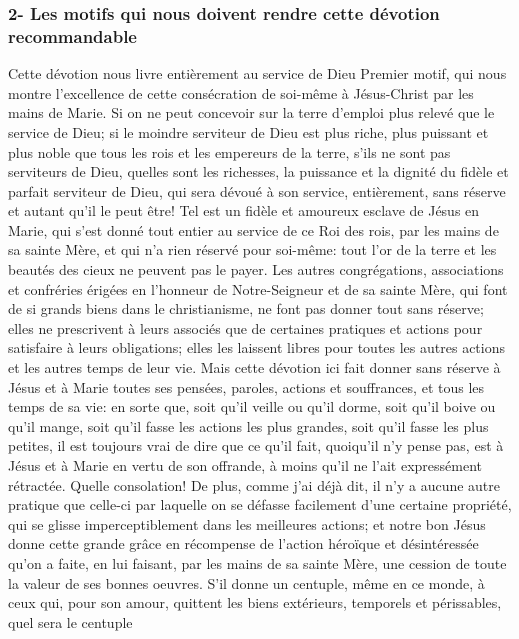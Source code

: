 \subsubsection{2- Les motifs qui nous doivent rendre cette dévotion recommandable}
Cette dévotion nous livre entièrement au service de Dieu
 Premier motif, qui nous montre l'excellence de cette consécration de soi-même à Jésus-Christ par les mains
de Marie.
Si on ne peut concevoir sur la terre d'emploi plus relevé que le service de Dieu; si le moindre serviteur de Dieu est
plus riche, plus puissant et plus noble que tous les rois et les empereurs de la terre, s'ils ne sont pas serviteurs de
Dieu, quelles sont les richesses, la puissance et la dignité du fidèle et parfait serviteur de Dieu, qui sera dévoué à
son service, entièrement, sans réserve et autant qu'il le peut être! Tel est un fidèle et amoureux esclave de Jésus
en Marie, qui s'est donné tout entier au service de ce Roi des rois, par les mains de sa sainte Mère, et qui n'a rien
réservé pour soi-même: tout l'or de la terre et les beautés des cieux ne peuvent pas le payer.
 Les autres congrégations, associations et confréries érigées en l'honneur de Notre-Seigneur et de sa sainte
Mère, qui font de si grands biens dans le christianisme, ne font pas donner tout sans réserve; elles ne prescrivent
à leurs associés que de certaines pratiques et actions pour satisfaire à leurs obligations; elles les laissent libres
pour toutes les autres actions et les autres temps de leur vie. Mais cette dévotion ici fait donner sans réserve à
Jésus et à Marie toutes ses pensées, paroles, actions et souffrances, et tous les temps de sa vie: en sorte que,
soit qu'il veille ou qu'il dorme, soit qu'il boive ou qu'il mange, soit qu'il fasse les actions les plus grandes, soit qu'il
fasse les plus petites, il est toujours vrai de dire que ce qu'il fait, quoiqu'il n'y pense pas, est à Jésus et à Marie en
vertu de son offrande, à moins qu'il ne l'ait expressément rétractée. Quelle consolation!
 De plus, comme j'ai déjà dit, il n'y a aucune autre pratique que celle-ci par laquelle on se défasse facilement
d'une certaine propriété, qui se glisse imperceptiblement dans les meilleures actions; et notre bon Jésus donne
cette grande grâce en récompense de l'action héroïque et désintéressée qu'on a faite, en lui faisant, par les mains
de sa sainte Mère, une cession de toute la valeur de ses bonnes oeuvres. S'il donne un centuple, même en ce
monde, à ceux qui, pour son amour, quittent les biens extérieurs, temporels et périssables, quel sera le centuple
